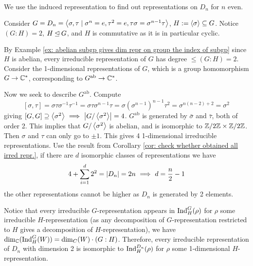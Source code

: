 \begin{example}[Representations of $D_n$]
    We use the induced representation to find out representations on $D_n$ for $n$ even.

    Consider $G = D_n = \left\langle  \sigma, \tau \mid \sigma^n = e, \tau^2 = e, \tau \sigma = \sigma^{n-1} \tau  \right\rangle$, $H := \left\langle \sigma \right\rangle \subseteq G$. Notice $(G : H) = 2$, $H \unlhd G$, and $H$ is commutative as it is in particular cyclic. 

    By Example \ref{ex: abelian subgp gives dim repr on group the index of subgp} since $H$ is abelian, every irreducible representation of $G$ has degree $\leq (G : H) = 2$. Consider the 1-dimensional representations of $G$, which is a group homomorphism $G \to \mathbb{C}^{\ast}$, corresponding to $G^{\text{ab}} \to \mathbb{C}^{\ast}$.

    Now we seek to describe $G^{\text{ab}}$. Compute
    \[
        [\sigma, \tau] = \sigma \tau \sigma^{-1} \tau^{-1} = \sigma \tau \sigma^{n-1} \tau = \sigma (\sigma^{n-1})^{n-1} \tau^2 = \sigma^{n(n-2) + 2} = \sigma^2
    \]
    giving $[G, G] \supseteq \left\langle \sigma^2 \right\rangle \ \Longrightarrow\  \left|G/\left\langle \sigma^2 \right\rangle\right| = 4$. $G^{\text{ab}}$ is generated by $\bar{\sigma}$ and $\bar{\tau}$, both of order 2. This implies that $G/\left\langle \sigma^2 \right\rangle$ is abelian, and is isomorphic to $\mathbb{Z}/2\mathbb{Z} \times \mathbb{Z}/2\mathbb{Z}$. Then $\sigma$ and $\tau$ can only go to $\pm 1$. This gives 4 1-dimensional irreducible representations. Use the result from Corollary \ref{cor: check whether obtained all irred repr.}, if there are $d$ isomorphic classes of representations we have
    \[
        4 + \sum_{i = 1}^d 2^2 = \left|D_n\right| = 2n \ \Longrightarrow\  d = \frac{n}{2} - 1
    \]
    the other representations cannot be higher as $D_n$ is generated by 2 elements.

    Notice that every irreducible $G$-representation appears in $\mathrm{Ind}_H^G(\rho)$ for $\rho$ some irreducible $H$-representation (as any decomposition of $G$-representation restricted to $H$ gives a decomposition of $H$-representation), we have $\dim_{\mathbb{C}} (\mathrm{Ind}_H^G(W)) = \dim_C(W) \cdot (G : H)$. Therefore, every irreducible representation of $D_n$ with dimension 2 is isomorphic to $\mathrm{Ind}_H^{D_n}(\rho)$ for $\rho$ some 1-dimensional $H$-representation.


\end{example}
